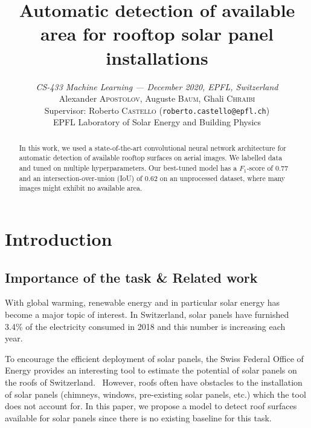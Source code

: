 \documentclass[10pt,conference]{IEEEtran}
\begin{document}
\title{{\LARGE Automatic detection of available area for rooftop solar panel installations}\vspace{-3mm}}    

\author{
  \textit{CS-433 Machine Learning --- December 2020, EPFL, Switzerland}\\
  Alexander \textsc{Apostolov}, Auguste \textsc{Baum}, Ghali \textsc{Chraibi}\\
  Supervisor: Roberto \textsc{Castello} (\texttt{roberto.castello@epfl.ch})\\ EPFL Laboratory of Solar Energy and Building Physics
}
\maketitle

\begin{abstract}
  In this work, we used a state-of-the-art convolutional neural network architecture for automatic detection of available rooftop surfaces on aerial images.
  We labelled data and tuned on multiple hyperparameters.
  Our best-tuned model has a $F_1$-score of 0.77 and an intersection-over-union (IoU) of 0.62 on an unprocessed dataset, where many images might exhibit no available area.
\end{abstract}

\section{Introduction}

\subsection{Importance of the task \& Related work}
With global warming, renewable energy and in particular solar energy has become a major topic of interest.
In Switzerland, solar panels have furnished 3.4\% of the electricity consumed in 2018 and this number is increasing each year.~\cite{roof_solar}

To encourage the efficient deployment of solar panels, the Swiss Federal Office of Energy provides an interesting tool to estimate the potential of solar panels on the roofs of Switzerland.~\cite{solar_consumption}
However, roofs often have obstacles to the installation of solar panels (chimneys, windows, pre-existing solar panels, etc.) which the tool does not account for.  
In this paper, we propose a model to detect roof surfaces available for solar panels since there is no existing baseline for this task.
\end{document}
